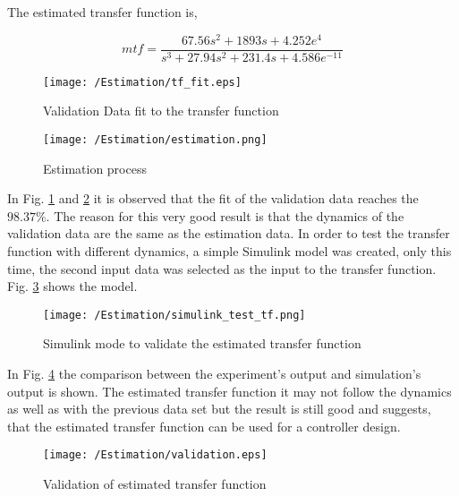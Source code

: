 \noindent The estimated transfer function is,

\begin{equation}
	mtf = \frac{67.56 s^2 + 1893 s + 4.252 e^4}{s^3 + 27.94 s^2 + 231.4 s + 4.586 e^{-11}}
\end{equation}


\begin{figure}[h!]
	\texttt{[image: /Estimation/tf\_fit.eps]}
    \caption{Validation Data fit to the transfer function}
    \label{Fig:estimation_fit}    
\end{figure}
    
\begin{figure}[h!]
    \texttt{[image: /Estimation/estimation.png]}
    \caption{Estimation process}
	\label{Fig:estimation process}
\end{figure}

In Fig. \ref{Fig:estimation_fit} and \ref{Fig:estimation process} it is observed that the fit of the validation data reaches the $98.37\%$. The reason for this very good result is that the dynamics of the validation data are the same as the estimation data. In order to test the transfer function with different dynamics, a simple Simulink model was created, only this time, the second input data was selected as the input to the transfer function. Fig. \ref{Fig:simulink_test_tf} shows the model.


\begin{figure}[h!]
	\texttt{[image: /Estimation/simulink\_test\_tf.png]}
    \caption{Simulink mode to validate the estimated transfer function}
	\label{Fig:simulink_test_tf}
\end{figure}

In Fig. \ref{Fig:validation_tf} the comparison between the experiment's output and simulation's output is shown. The estimated transfer function it may not follow the dynamics as well as with the previous data set but the result is still good and suggests, that the estimated transfer function can be used for a controller design.

\begin{figure}[h!]
	\texttt{[image: /Estimation/validation.eps]}
    \caption{Validation of estimated transfer function}
	\label{Fig:validation_tf}
\end{figure}